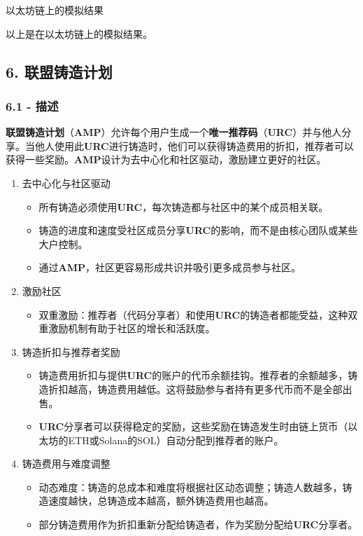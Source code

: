 \documentclass[
]{article}
\providecommand{\tightlist}{%
  \setlength{\itemsep}{0pt}\setlength{\parskip}{0pt}}
\begin{document}
以太坊链上的模拟结果

以上是在以太坊链上的模拟结果。

\subsection{6. 联盟铸造计划}\label{ux8054ux76dfux94f8ux9020ux8ba1ux5212}

\subsubsection{6.1 - 描述}\label{ux63cfux8ff0}

\textbf{联盟铸造计划}（\textbf{AMP}）允许每个用户生成一个\textbf{唯一推荐码}（\textbf{URC}）并与他人分享。当他人使用此\textbf{URC}进行铸造时，他们可以获得铸造费用的折扣，推荐者可以获得一些奖励。\textbf{AMP}设计为去中心化和社区驱动，激励建立更好的社区。

\begin{enumerate}
\def\labelenumi{\arabic{enumi}.}
\tightlist
\item
  去中心化与社区驱动

  \begin{itemize}
  \tightlist
  \item
    所有铸造必须使用\textbf{URC}，每次铸造都与社区中的某个成员相关联。
  \item
    铸造的进度和速度受社区成员分享\textbf{URC}的影响，而不是由核心团队或某些大户控制。
  \item
    通过\textbf{AMP}，社区更容易形成共识并吸引更多成员参与社区。
  \end{itemize}
\item
  激励社区

  \begin{itemize}
  \tightlist
  \item
    双重激励：推荐者（代码分享者）和使用\textbf{URC}的铸造者都能受益，这种双重激励机制有助于社区的增长和活跃度。
  \end{itemize}
\item
  铸造折扣与推荐者奖励

  \begin{itemize}
  \tightlist
  \item
    铸造费用折扣与提供\textbf{URC}的账户的代币余额挂钩。推荐者的余额越多，铸造折扣越高，铸造费用越低。这将鼓励参与者持有更多代币而不是全部出售。
  \item
    \textbf{URC}分享者可以获得稳定的奖励，这些奖励在铸造发生时由链上货币（以太坊的ETH或Solana的SOL）自动分配到推荐者的账户。
  \end{itemize}
\item
  铸造费用与难度调整

  \begin{itemize}
  \tightlist
  \item
    动态难度：铸造的总成本和难度将根据社区动态调整；铸造人数越多，铸造速度越快，总铸造成本越高，额外铸造费用也越高。
  \item
    部分铸造费用作为折扣重新分配给铸造者，作为奖励分配给\textbf{URC}分享者。
  \end{itemize}
\end{enumerate}
\end{document}
